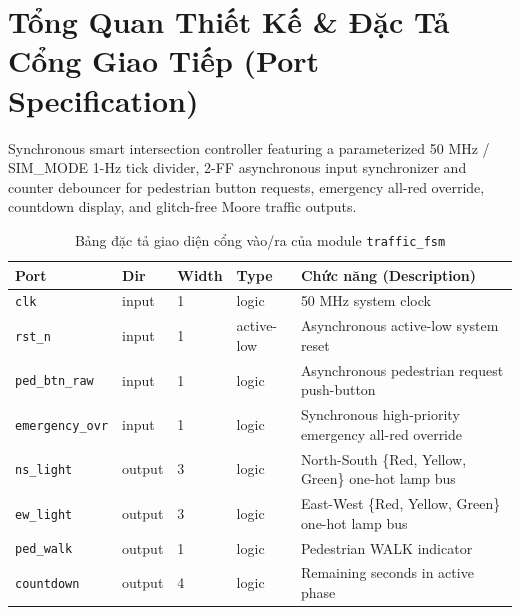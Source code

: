 \documentclass[11pt,a4paper]{article}
\begin{document}
\section{Tổng Quan Thiết Kế \& Đặc Tả Cổng Giao Tiếp (Port Specification)}
Synchronous smart intersection controller featuring a parameterized 50 MHz / SIM\_MODE 1-Hz tick divider, 2-FF asynchronous input synchronizer and counter debouncer for pedestrian button requests, emergency all-red override, countdown display, and glitch-free Moore traffic outputs.

\begin{table}[H]
    \centering
    \small
    \caption{Bảng đặc tả giao diện cổng vào/ra của module \texttt{traffic\_fsm}}
    \begin{tabularx}{\textwidth}{@{}llllX@{}}
        \toprule
        \textbf{Port} & \textbf{Dir} & \textbf{Width} & \textbf{Type} & \textbf{Chức năng (Description)} \\
        \midrule
        \texttt{clk} & input & 1 & logic & 50 MHz system clock \\
        \texttt{rst\_n} & input & 1 & active-low & Asynchronous active-low system reset \\
        \texttt{ped\_btn\_raw} & input & 1 & logic & Asynchronous pedestrian request push-button \\
        \texttt{emergency\_ovr} & input & 1 & logic & Synchronous high-priority emergency all-red override \\
        \texttt{ns\_light} & output & 3 & logic & North-South \{Red, Yellow, Green\} one-hot lamp bus \\
        \texttt{ew\_light} & output & 3 & logic & East-West \{Red, Yellow, Green\} one-hot lamp bus \\
        \texttt{ped\_walk} & output & 1 & logic & Pedestrian WALK indicator \\
        \texttt{countdown} & output & 4 & logic & Remaining seconds in active phase \\
        \bottomrule
    \end{tabularx}
\end{table}
\end{document}
